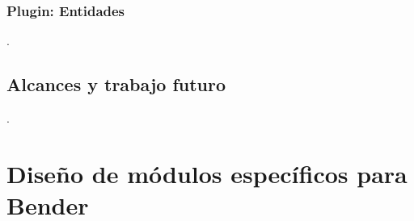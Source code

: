 \subsubsection{Plugin: Entidades}

.

\subsection{Alcances y trabajo futuro}
 .




\section{Diseño de módulos específicos para Bender}

